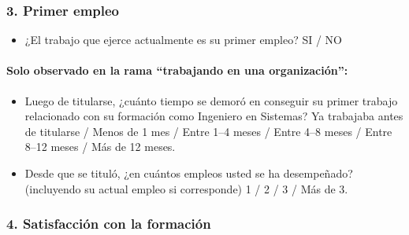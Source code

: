 \documentclass[12pt]{article}
\begin{document}
\subsubsection*{3. Primer empleo}

\begin{itemize}[nosep]
    \item ¿El trabajo que ejerce actualmente es su primer empleo? SI / NO
\end{itemize}

\paragraph{Solo observado en la rama ``trabajando en una organización'':}
\begin{itemize}[nosep]
    \item Luego de titularse, ¿cuánto tiempo se demoró en conseguir su
    primer trabajo relacionado con su formación como Ingeniero en
    Sistemas? Ya trabajaba antes de titularse / Menos de 1 mes / Entre
    1--4 meses / Entre 4--8 meses / Entre 8--12 meses / Más de 12 meses.
    \item Desde que se tituló, ¿en cuántos empleos usted se ha
    desempeñado? (incluyendo su actual empleo si corresponde) 1 / 2 / 3 /
    Más de 3.
\end{itemize}

\subsubsection*{4. Satisfacción con la formación}
\end{document}
